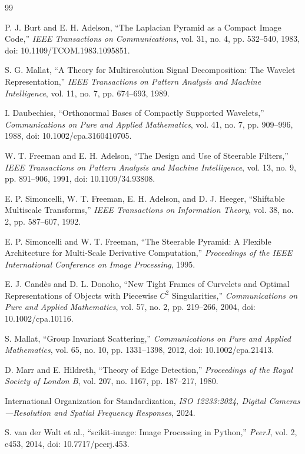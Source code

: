 \documentclass[12pt,openany,oneside]{book}
\begin{document}
\begin{thebibliography}{99}
\begin{LTR}
P. J. Burt and E. H. Adelson,
``The Laplacian Pyramid as a Compact Image Code,''
\emph{IEEE Transactions on Communications}, vol. 31, no. 4, pp. 532--540, 1983,
doi: 10.1109/TCOM.1983.1095851.

S. G. Mallat,
``A Theory for Multiresolution Signal Decomposition: The Wavelet Representation,''
\emph{IEEE Transactions on Pattern Analysis and Machine Intelligence}, vol. 11, no. 7,
pp. 674--693, 1989.

I. Daubechies,
``Orthonormal Bases of Compactly Supported Wavelets,''
\emph{Communications on Pure and Applied Mathematics}, vol. 41, no. 7,
pp. 909--996, 1988, doi: 10.1002/cpa.3160410705.

W. T. Freeman and E. H. Adelson,
``The Design and Use of Steerable Filters,''
\emph{IEEE Transactions on Pattern Analysis and Machine Intelligence}, vol. 13, no. 9,
pp. 891--906, 1991, doi: 10.1109/34.93808.

E. P. Simoncelli, W. T. Freeman, E. H. Adelson, and D. J. Heeger,
``Shiftable Multiscale Transforms,''
\emph{IEEE Transactions on Information Theory}, vol. 38, no. 2,
pp. 587--607, 1992.

E. P. Simoncelli and W. T. Freeman,
``The Steerable Pyramid: A Flexible Architecture for Multi-Scale Derivative Computation,''
\emph{Proceedings of the IEEE International Conference on Image Processing}, 1995.

E. J. Cand\`es and D. L. Donoho,
``New Tight Frames of Curvelets and Optimal Representations of Objects with Piecewise $C^2$ Singularities,''
\emph{Communications on Pure and Applied Mathematics}, vol. 57, no. 2, pp. 219--266, 2004,
doi: 10.1002/cpa.10116.

S. Mallat,
``Group Invariant Scattering,''
\emph{Communications on Pure and Applied Mathematics}, vol. 65, no. 10,
pp. 1331--1398, 2012, doi: 10.1002/cpa.21413.

D. Marr and E. Hildreth,
``Theory of Edge Detection,''
\emph{Proceedings of the Royal Society of London B}, vol. 207, no. 1167,
pp. 187--217, 1980.

International Organization for Standardization,
\emph{ISO 12233:2024, Digital Cameras---Resolution and Spatial Frequency Responses}, 2024.

S. van der Walt et al.,
``scikit-image: Image Processing in Python,''
\emph{PeerJ}, vol. 2, e453, 2014, doi: 10.7717/peerj.453.


\end{LTR}
\end{thebibliography}
\end{document}
